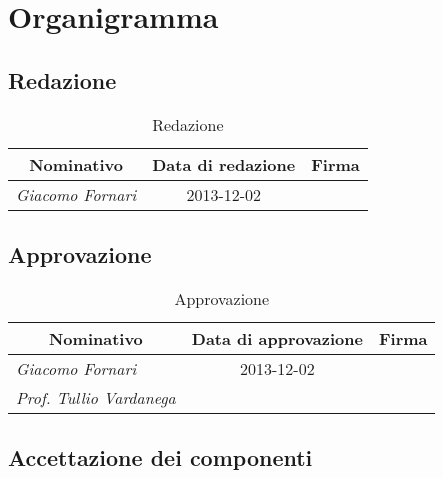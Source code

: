 \section{Organigramma}

	\subsection{Redazione}
	
	\def\arraystretch{2}
	\begin{table}[h]
	\centering
	\begin{tabular}{ l c l }
	\hline
	\multicolumn{1}{c}{\textbf{Nominativo}} & \multicolumn{1}{c}{\textbf{Data di redazione}} & \multicolumn{1}{c}{\textbf{Firma}} \\
	\hline
	\textit{Giacomo Fornari} & 2013-12-02 & \hspace{5cm} \\
	\hline
	\end{tabular}
	\caption{Redazione}
	\end{table}
		
	\subsection{Approvazione}
	
	\begin{table}[h]
	\begin{adjustwidth}{-4cm}{-4cm}
	\centering
	\begin{tabular}{ l c l }
	\hline
	\multicolumn{1}{c}{\textbf{Nominativo}} & \multicolumn{1}{c}{\textbf{Data di approvazione}} & \multicolumn{1}{c}{\textbf{Firma}} \\
	\hline
	\textit{Giacomo Fornari} & 2013-12-02 & \hspace{5cm} \\
	\textit{Prof. Tullio Vardanega} &  & \hspace{5cm} \\
	\hline
	\end{tabular}
	\caption{Approvazione}
	\end{adjustwidth}
	\end{table}
	
	\subsection{Accettazione dei componenti}
	
